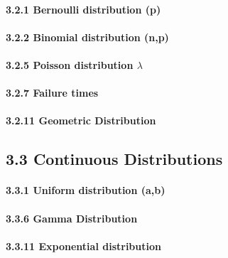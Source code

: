 \documentclass[6pt,Portrait]{article}
\let\oldparagraph\paragraph
\renewcommand{\paragraph}[1]{\oldparagraph{#1}\mbox{}}
\begin{document}
\hypertarget{Bern}{%
\paragraph{3.2.1 Bernoulli distribution (p)}\label{Bern}}

\hypertarget{Bino}{%
\paragraph{3.2.2 Binomial distribution (n,p)}\label{Bino}}

\hypertarget{Pois}{%
\paragraph{\texorpdfstring{3.2.5 Poisson distribution
\(\lambda\)}{3.2.5 Poisson distribution \textbackslash{}lambda}}\label{Pois}}

\hypertarget{failtime}{%
\paragraph{3.2.7 Failure times}\label{failtime}}

\hypertarget{Geom}{%
\paragraph{3.2.11 Geometric Distribution}\label{Geom}}

\hypertarget{continuous-distributions}{%
\subsection{3.3 Continuous
Distributions}\label{continuous-distributions}}

\hypertarget{Unif}{%
\paragraph{3.3.1 Uniform distribution (a,b)}\label{Unif}}

\hypertarget{Gamma}{%
\paragraph{3.3.6 Gamma Distribution}\label{Gamma}}

\hypertarget{Expo}{%
\paragraph{3.3.11 Exponential distribution}\label{Expo}}
\end{document}
